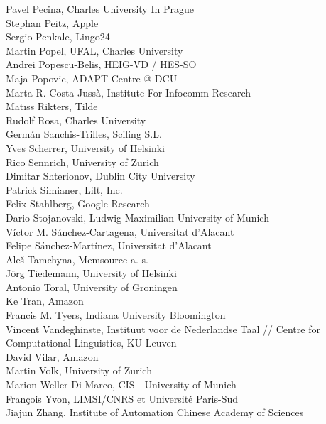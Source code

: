 \documentclass[a4paper,11pt,twoside]{book}
\begin{document}
\noindent Pavel Pecina, Charles University In Prague\\
\noindent Stephan Peitz, Apple\\
\noindent Sergio Penkale, Lingo24\\
\noindent Martin Popel, UFAL, Charles University\\
\noindent Andrei Popescu-Belis, HEIG-VD / HES-SO\\
\noindent Maja Popovic, ADAPT Centre @ DCU\\
\noindent Marta R. Costa-Jussà, Institute For Infocomm Research\\
\noindent Matīss Rikters, Tilde\\
\noindent Rudolf Rosa, Charles University\\
\noindent Germán Sanchis-Trilles, Sciling S.L.\\
\noindent Yves Scherrer, University of Helsinki\\
\noindent Rico Sennrich, University of Zurich\\
\noindent Dimitar Shterionov, Dublin City University\\
\noindent Patrick Simianer, Lilt, Inc.\\
\noindent Felix Stahlberg, Google Research\\
\noindent Dario Stojanovski, Ludwig Maximilian University of Munich\\
\noindent Víctor M. Sánchez-Cartagena, Universitat d'Alacant\\
\noindent Felipe Sánchez-Martínez, Universitat d'Alacant\\
\noindent Aleš Tamchyna, Memsource a. s.\\
\noindent Jörg Tiedemann, University of Helsinki\\
\noindent Antonio Toral, University of Groningen\\
\noindent Ke Tran, Amazon\\
\noindent Francis M. Tyers, Indiana University Bloomington\\
\noindent Vincent Vandeghinste, Instituut voor de Nederlandse Taal // Centre for Computational Linguistics, KU Leuven\\
\noindent David Vilar, Amazon\\
\noindent Martin Volk, University of Zurich\\
\noindent Marion Weller-Di Marco, CIS - University of Munich\\
\noindent François Yvon, LIMSI/CNRS et Université Paris-Sud\\
\noindent Jiajun Zhang, Institute of Automation Chinese Academy of Sciences\\
\end{document}
